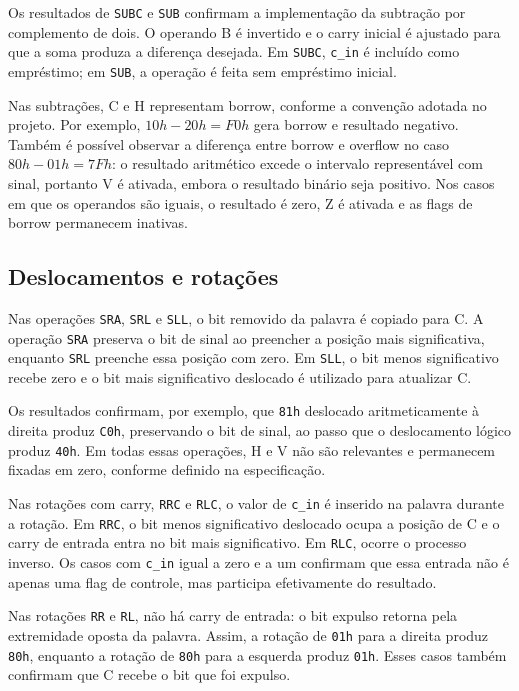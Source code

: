 Os resultados de \texttt{SUBC} e \texttt{SUB} confirmam a implementação da
subtração por complemento de dois. O operando B é invertido e o carry inicial
é ajustado para que a soma produza a diferença desejada. Em \texttt{SUBC},
\texttt{c\_in} é incluído como empréstimo; em \texttt{SUB}, a operação é feita
sem empréstimo inicial.

Nas subtrações, C e H representam borrow, conforme a convenção adotada no
projeto. Por exemplo, $10h - 20h = F0h$ gera borrow e resultado negativo.
Também é possível observar a diferença entre borrow e overflow no caso
$80h - 01h = 7Fh$: o resultado aritmético excede o intervalo representável
com sinal, portanto V é ativada, embora o resultado binário seja positivo.
Nos casos em que os operandos são iguais, o resultado é zero, Z é ativada e
as flags de borrow permanecem inativas.

\subsection{Deslocamentos e rotações}

Nas operações \texttt{SRA}, \texttt{SRL} e \texttt{SLL}, o bit removido da
palavra é copiado para C. A operação \texttt{SRA} preserva o bit de sinal ao
preencher a posição mais significativa, enquanto \texttt{SRL} preenche essa
posição com zero. Em \texttt{SLL}, o bit menos significativo recebe zero e o
bit mais significativo deslocado é utilizado para atualizar C.

Os resultados confirmam, por exemplo, que \texttt{81h} deslocado
aritmeticamente à direita produz \texttt{C0h}, preservando o bit de sinal, ao
passo que o deslocamento lógico produz \texttt{40h}. Em todas essas operações,
H e V não são relevantes e permanecem fixadas em zero, conforme definido na
especificação.

Nas rotações com carry, \texttt{RRC} e \texttt{RLC}, o valor de
\texttt{c\_in} é inserido na palavra durante a rotação. Em \texttt{RRC}, o
bit menos significativo deslocado ocupa a posição de C e o carry de entrada
entra no bit mais significativo. Em \texttt{RLC}, ocorre o processo inverso.
Os casos com \texttt{c\_in} igual a zero e a um confirmam que essa entrada
não é apenas uma flag de controle, mas participa efetivamente do resultado.

Nas rotações \texttt{RR} e \texttt{RL}, não há carry de entrada: o bit
expulso retorna pela extremidade oposta da palavra. Assim, a rotação de
\texttt{01h} para a direita produz \texttt{80h}, enquanto a rotação de
\texttt{80h} para a esquerda produz \texttt{01h}. Esses casos também
confirmam que C recebe o bit que foi expulso.

